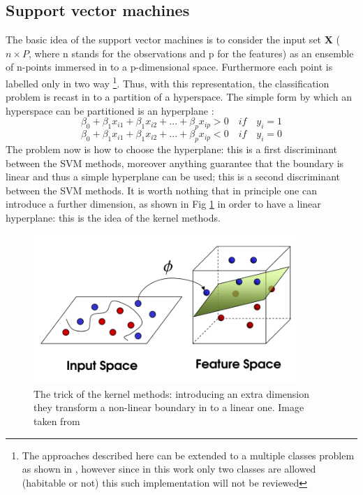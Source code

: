 \documentclass[
12pt, %
a4paper, %
oneside, %
headinclude,footinclude, %
BCOR5mm, %
]{scrartcl}
\begin{document}
\clearpage
\subsection{Support vector machines}
The basic idea of the support vector machines is to consider the input set \textbf{X} ($n\times P$, where n stands for the observations and p for the features) as an ensemble of n-points immersed in to a p-dimensional space. Furthermore each point is labelled only in two way \footnote{The approaches described here can be extended to a multiple classes problem as shown in \cite{james2013introduction}, however since in this work only two classes are allowed (habitable or not) this such implementation will not be reviewed}. Thus, with this representation, the classification problem is recast in to a partition of a hyperspace. The simple form by which an hyperspace can be partitioned is an hyperplane \cite{james2013introduction}: 
\begin{equation}
\beta_{0}+\beta_{1}x_{i1}+\beta_{1}x_{i2}+...+\beta_{p}x_{ip} > 0\quad if \quad y_{i}=1
\end{equation}
\begin{equation}
\beta_{0}+\beta_{1}x_{i1}+\beta_{1}x_{i2}+...+\beta_{p}x_{ip} < 0\quad if \quad y_{i}=0
\end{equation}
The problem now is how to choose the hyperplane: this is a first discriminant between the SVM methods, moreover anything guarantee that the boundary is linear and thus a simple hyperplane can be used; this is a second discriminant between the SVM methods. It is worth nothing that in principle one can introduce a further dimension, as shown in Fig \ref{Kernel_methods} in order to have a linear hyperplane: this is the idea of the kernel methods\cite{james2013introduction,marsland2015machine}. 
\begin{figure}[h]
\begin{center}
\includegraphics[width=0.9\textwidth]{Pic/kernel_trick.png}
\caption{The trick of the kernel methods: introducing an extra dimension they transform a non-linear boundary in to a linear one. Image taken from \cite{kernel}}
\label{Kernel_methods}
\end{center}
\end{figure}
\end{document}
